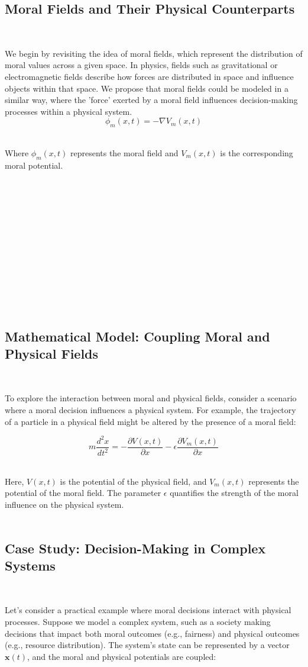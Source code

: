 \documentclass{article}
\begin{document}
\subsection{Moral Fields and Their Physical Counterparts}
\

We begin by revisiting the idea of moral fields, which represent the distribution of moral values across a given space. In physics, fields such as gravitational or electromagnetic fields describe how forces are distributed in space and influence objects within that space. We propose that moral fields could be modeled in a similar way, where the 'force' exerted by a moral field influences decision-making processes within a physical system.
\\
\[
\phi_m(x, t) = -\nabla V_m(x, t)
\]
\

Where \( \phi_m(x, t) \) represents the moral field and \( V_m(x, t) \) is the corresponding moral potential.
\

\

\

\

\

\

\

\
\subsection{Mathematical Model: Coupling Moral and Physical Fields}
\

To explore the interaction between moral and physical fields, consider a scenario where a moral decision influences a physical system. For example, the trajectory of a particle in a physical field might be altered by the presence of a moral field:

\[
m \frac{d^2 x}{dt^2} = -\frac{\partial V(x, t)}{\partial x} - \epsilon \frac{\partial V_m(x, t)}{\partial x}
\]
\

Here, \( V(x, t) \) is the potential of the physical field, and \( V_m(x, t) \) represents the potential of the moral field. The parameter \( \epsilon \) quantifies the strength of the moral influence on the physical system.
\\
\\
\subsection{Case Study: Decision-Making in Complex Systems}
\

Let's consider a practical example where moral decisions interact with physical processes. Suppose we model a complex system, such as a society making decisions that impact both moral outcomes (e.g., fairness) and physical outcomes (e.g., resource distribution). The system's state can be represented by a vector \( \mathbf{x}(t) \), and the moral and physical potentials are coupled:
\end{document}
